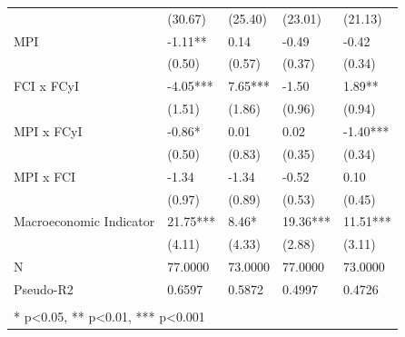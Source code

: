 \begin{table}[!ht]
\begin{center}
{\begin{tabular}{p{7cm}p{1.5cm}p{1.5cm}p{1.5cm}p{1.5cm}}
                           & (30.67)                     & (25.40)                     & (23.01)                     & (21.13)                      \\
MPI                        & -1.11**                     & 0.14                        & -0.49                       & -0.42                        \\
                           & (0.50)                      & (0.57)                      & (0.37)                      & (0.34)                       \\
FCI x FCyI                 & -4.05***                    & 7.65***                     & -1.50                       & 1.89**                       \\
                           & (1.51)                      & (1.86)                      & (0.96)                      & (0.94)                       \\
MPI x FCyI                 & -0.86*                      & 0.01                        & 0.02                        & -1.40***                     \\
                           & (0.50)                      & (0.83)                      & (0.35)                      & (0.34)                       \\
MPI x FCI                  & -1.34                       & -1.34                       & -0.52                       & 0.10                         \\
                           & (0.97)                      & (0.89)                      & (0.53)                      & (0.45)                       \\
Macroeconomic Indicator    & 21.75***                    & 8.46*                       & 19.36***                    & 11.51***                     \\
                           & (4.11)                      & (4.33)                      & (2.88)                      & (3.11)                       \\
N                          & 77.0000                     & 73.0000                     & 77.0000                     & 73.0000                      \\
Pseudo-R2                  & 0.6597                      & 0.5872                      & 0.4997                      & 0.4726                       \\
\hline \\
\multicolumn{3}{l}{* p<0.05,  ** p<0.01,  *** p<0.001}
\end{tabular}
}
\end{center}
\end{table}